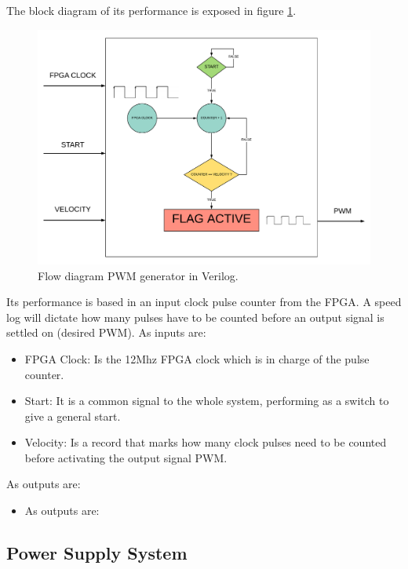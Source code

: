 The block diagram of its performance is exposed in figure \ref{fig:pwm_control}.

\begin{figure}[H]
	\center
	\includegraphics[trim = 0mm 0mm 0mm 0mm, clip,scale=0.4]{imagenes/Balancing_robot/pwm_control.pdf}
	\caption{Flow diagram PWM generator in Verilog.}
	\label{fig:pwm_control}
\end{figure}

Its performance is based in an input clock pulse counter from the FPGA. A speed log will dictate how many pulses have to be counted before an output signal is settled on (desired PWM). As inputs are: \newline 
\begin{itemize}
	\item FPGA Clock: Is the 12Mhz FPGA clock which is in charge of the pulse counter.
	\item Start: It is a common signal to the whole system, performing as a switch to give a general start.
	\item Velocity: Is a record that marks how many clock pulses need to be counted before activating the output signal PWM.
\end{itemize}

As outputs are:
\begin{itemize}
	\item As outputs are:
\end{itemize}



\subsection{Power Supply System}


